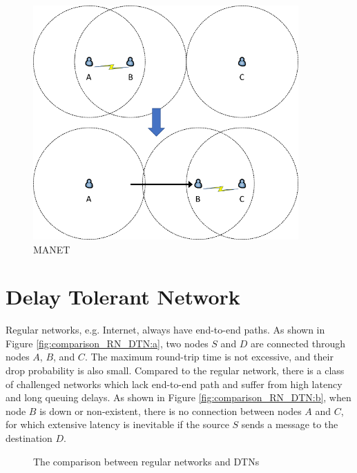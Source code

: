 \begin{figure} [H]
  \centering 
  \includegraphics[width=4.0in]{figures/FIG_MANET.png}
  \caption{MANET} 
  \label{fig:MANET} %
\end{figure}

\section{Delay Tolerant Network}

\noindent Regular networks, e.g. Internet, always have end-to-end paths. As shown in Figure \ref{fig:comparison_RN_DTN:a}, two nodes $S$ and $D$ are connected through nodes $A$, $B$, and $C$. The maximum round-trip time is not excessive, and their drop probability is also small. Compared to the regular network, there is a class of challenged networks \cite {C1} which lack end-to-end path and suffer from high latency and long queuing delays. As shown in Figure \ref{fig:comparison_RN_DTN:b}, when node $B$ is down or non-existent, there is no connection between nodes $A$ and $C$, for which extensive latency is inevitable if the source $S$ sends a message to the destination $D$.

\begin{figure} [H]
  \centering 
  \hspace{1in} 
  \caption{The comparison between regular networks and DTNs} 
  \label{fig:comparison_RN_DTN} %
\end{figure}

